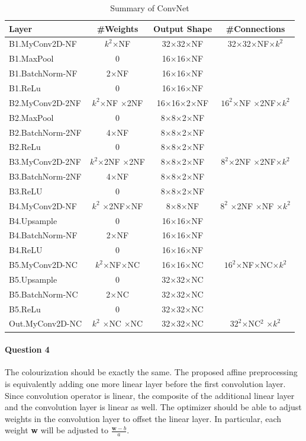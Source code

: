\documentclass[12pt]{article}
\newcommand{\m}[0]{$\times$}
\begin{document}
	\begin{table}[H]
		\centering
		\small
		\caption{Summary of ConvNet}
		\begin{tabular}{l|c c c}
			\toprule
			Layer & \#Weights & Output Shape & \#Connections\\
			\midrule
			B1.MyConv2D-NF & $k^2$\m NF & 32\m 32\m NF & 32\m 32\m NF\m $k^2$ \\
			B1.MaxPool & 0 & 16\m 16\m NF & \\
			B1.BatchNorm-NF & 2\m NF & 16\m 16\m NF & \\
			B1.ReLu & 0 & 16\m 16\m NF & \\
			\midrule
			B2.MyConv2D-2NF & $k^2$\m NF \m 2NF & 16\m 16\m 2\m NF & $16^2$\m NF \m 2NF\m $k^2$ \\
			B2.MaxPool & 0 & 8\m 8\m 2\m NF & \\
			B2.BatchNorm-2NF & 4\m NF & 8\m 8\m 2\m NF & \\
			B2.ReLu & 0 & 8\m 8\m 2\m NF & \\
			\midrule
			B3.MyConv2D-2NF & $k^2$\m 2NF \m 2NF & 8\m 8\m 2\m NF & $8^2$\m 2NF \m 2NF\m $k^2$ \\
			B3.BatchNorm-2NF & 4\m NF & 8\m 8\m 2\m NF & \\
			B3.ReLU & 0 & 8\m 8\m 2\m NF & \\
			\midrule
			B4.MyConv2D-NF & $k^2$ \m 2NF\m NF & 8\m 8\m NF & $8^2$ \m 2NF \m NF \m $k^2$ \\
			B4.Upsample & 0 & 16\m 16\m NF & \\
			B4.BatchNorm-NF & 2\m NF & 16\m 16\m NF & \\
			B4.ReLU & 0 & 16\m 16\m NF & \\
			\midrule
			B5.MyConv2D-NC & $k^2$\m NF\m NC & 16\m 16\m NC & $16^2$\m NF\m NC\m $k^2$ \\
			B5.Upsample & 0 & 32\m 32\m NC & \\
			B5.BatchNorm-NC & 2\m NC & 32\m 32\m NC & \\
			B5.ReLu & 0 & 32\m 32\m NC & \\
			\midrule
			Out.MyConv2D-NC & $k^2$ \m NC \m NC & 32\m 32\m NC & $32^2$\m NC$^2$ \m $k^2$ \\
			\bottomrule
		\end{tabular}
	\end{table}
	\paragraph{Question 4} The colourization should be exactly the same. The proposed affine preprocessing is equivalently adding one more linear layer before the first convolution layer. Since convolution operator is linear, the composite of the additional linear layer and the convolution layer is linear as well. The optimizer should be able to adjust weights in the convolution layer to offset the linear layer. In particular, each weight \textbf{w} will be adjusted to $\frac{\textbf{w} - b}{a}$.
	
\end{document}
